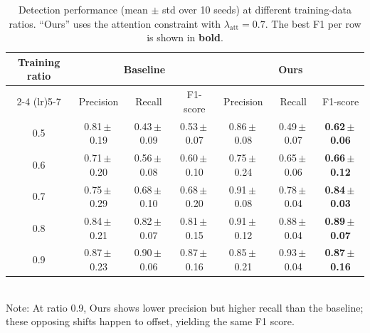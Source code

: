 \documentclass[lettersize,journal]{IEEEtran}
\begin{document}
\begin{table}[]
\centering
\caption{Detection performance (mean $\pm$ std over 10 seeds) at different
training-data ratios. ``Ours'' uses the attention constraint with
$\lambda_{\mathrm{att}}=0.7$. The best F1 per row is shown in \textbf{bold}.}
\label{tab:bbox_results}
\setlength{\tabcolsep}{4pt}
\renewcommand{\arraystretch}{1.2}
\begin{tabular}{c ccc ccc}
\toprule
\multirow{2}{*}{Training ratio} & \multicolumn{3}{c}{Baseline} &
\multicolumn{3}{c}{Ours} \\
\cmidrule(lr){2-4} \cmidrule(lr){5-7} & Precision & Recall & F1-score &
 Precision & Recall & F1-score \\
\midrule
0.5 & 0.81\,$\pm$\,0.19 & 0.43\,$\pm$\,0.09 & 0.53\,$\pm$\,0.07 &
    0.86\,$\pm$\,0.08 & 0.49\,$\pm$\,0.07 & \textbf{0.62\,$\pm$\,0.06} \\
0.6 & 0.71\,$\pm$\,0.20 & 0.56\,$\pm$\,0.08 & 0.60\,$\pm$\,0.10 &
    0.75\,$\pm$\,0.24 & 0.65\,$\pm$\,0.06 & \textbf{0.66\,$\pm$\,0.12} \\
0.7 & 0.75\,$\pm$\,0.29 & 0.68\,$\pm$\,0.10 & 0.68\,$\pm$\,0.20 &
    0.91\,$\pm$\,0.08 & 0.78\,$\pm$\,0.04 & \textbf{0.84\,$\pm$\,0.03} \\
0.8 & 0.84\,$\pm$\,0.21 & 0.82\,$\pm$\,0.07 & 0.81\,$\pm$\,0.15 &
    0.91\,$\pm$\,0.12 & 0.88\,$\pm$\,0.04 & \textbf{0.89\,$\pm$\,0.07} \\
0.9 & 0.87\,$\pm$\,0.23 & 0.90\,$\pm$\,0.06 & 0.87\,$\pm$\,0.16 &
    0.85\,$\pm$\,0.21 & 0.93\,$\pm$\,0.04 & \textbf{0.87\,$\pm$\,0.16} \\
\bottomrule
\end{tabular}\\
Note: At ratio 0.9, Ours shows lower precision but higher recall than the
baseline; \\these opposing shifts happen to offset, yielding the same F1 score.
\end{table}
\end{document}
